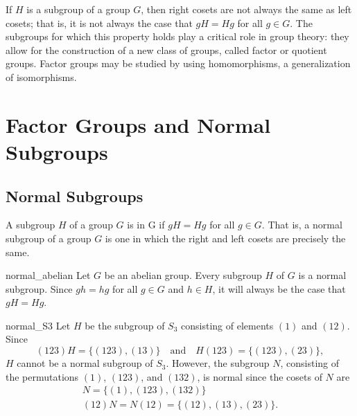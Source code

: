 

If $H$ is a subgroup of a group $G$, then right cosets are not always the same as left cosets; that is, it is not always the case that $gH = Hg$ for all $g \in G$.  The subgroups for which this property holds play a critical role in group theory: they allow for the construction of a new class of groups, called factor or quotient groups.  Factor groups may be studied by using homomorphisms, a generalization of isomorphisms. 
 

\section{Factor Groups and Normal Subgroups}
 
\subsection*{Normal Subgroups}

A subgroup $H$ of a group $G$ is  in G if $gH =
Hg$ for all $g \in G$. That is, a normal subgroup of a group $G$ is
one in which the right and left cosets are precisely the same. 
 
\begin{example}{normal_abelian}
Let $G$ be an abelian group. Every subgroup $H$ of $G$ is a normal
subgroup.  Since $gh = hg$ for all $g \in G$ and $h \in H$, it will
always be the case that $gH = Hg$. 
\end{example}
 
\begin{example}{normal_S3}
Let $H$ be the subgroup of $S_3$ consisting of elements $(1)$ and
$(12)$. Since 
\[
(123) H = \{ (123), (13) \}
\quad
\text{and}
\quad
H (123) = \{ (123), (23) \},
\]
$H$ cannot be a normal subgroup of $S_3$.  However, the subgroup $N$,
consisting of the permutations $(1)$, $(123)$, and $(132)$, is normal
since the cosets of $N$ are 
\[
\begin{array}{c}
N  =   \{ (1), (123), (132) \} \\
(12) N =  N (12)  =  \{ (12), (13), (23) \}.
\end{array}
\]
\end{example}
 
